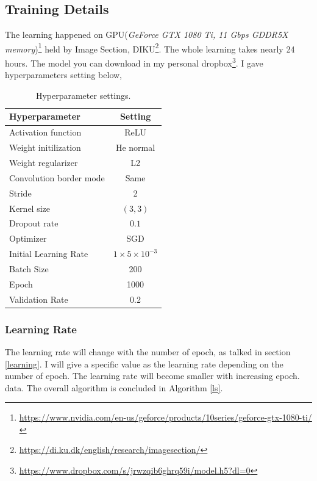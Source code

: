 \subsection{Training Details}
    The learning happened on GPU(\textit{GeForce GTX 1080 Ti, 11 Gbps GDDR5X memory})\footnote{\url{https://www.nvidia.com/en-us/geforce/products/10series/geforce-gtx-1080-ti/}} held by Image Section, DIKU\footnote{\url{https://di.ku.dk/english/research/imagesection/}}. The whole learning takes nearly 24 hours. The model you can download in my personal dropbox\footnote{\url{https://www.dropbox.com/s/jrwzqib6ghrq59i/model.h5?dl=0}}. I gave hyperparameters setting below,
    \begin{table}[h!]
        \centering
        \begin{tabular}{ l | c  }
            Hyperparameter  & Setting \\ \hline
            Activation function & ReLU \\
            Weight initilization & He normal\cite{sutskever2013importance} \\
            Weight regularizer &  L2 \cite{hinton2006fast} \\
            Convolution border mode  & Same \\
            Stride & 2 \\ 
            Kernel size & $(3, 3)$ \\
            Dropout rate & $0.1$ \\
            Optimizer & SGD \\
            Initial Learning Rate & $1\times 5\times10^{-3}$ \\
            Batch Size & 200 \\
            Epoch & 1000 \\
            Validation Rate & 0.2 \\
        \end{tabular}
        \caption{Hyperparameter settings.}
        \label{table:hyper}
    \end{table}
    \subsubsection{Learning Rate}
    The learning rate will change with the number of epoch, as talked in section \ref{learning}. I will give a specific value as the learning rate depending on the number of epoch. The learning rate will become smaller with increasing epoch. 
    data. The overall algorithm is concluded in Algorithm \ref{ls}.

